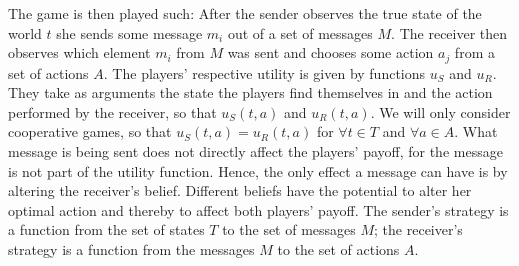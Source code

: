 \documentclass[10]{article}
\begin{document}
The game is then played such: After the sender observes the true state of the world $t$ she sends some message $m_i$ out of a set of messages $M$.
The receiver then observes which element $m_i$ from $M$ was sent and chooses some action $a_j$ from a set of actions $A$.
The players' respective utility is given by functions $u_S$ and $u_R$. They take as arguments the state the players find themselves in and the action performed by the receiver, so that $u_S(t,a)$ and $u_R(t,a)$. We will only consider cooperative games, so that $u_S(t,a)=u_R(t,a)$ for $\forall t\in T$ and $\forall a\in A$.
What message is being sent does not directly affect the players' payoff, for the message is not part of the utility function. Hence, the only effect a message can have is by altering the receiver's belief. Different beliefs have the potential to alter her optimal action and thereby to affect both players' payoff.
The sender's strategy is a function from the set of states $T$ to the set of messages $M$; the receiver's strategy is a function from the messages $M$ to the set of actions $A$. 
\begin{comment}
A pure strategy is thus a complete plan of action which tells the players exactly how to react in any situation in the game where they have the power to decide what action to take. \textit{Pure} here simply means that a player will choose a some action with certainty, that is, always, when confronted with a given situation. In contrast to pure strategies stand \textit{mixed} strategies where players will choose from various actions, each with a certain probability.
\end{comment}
\end{document}
